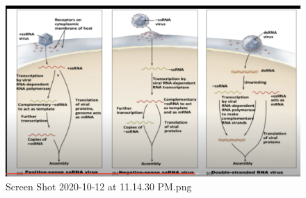 \documentclass[letterpaper]{article}
\begin{document}
\begin{figure}[htbp]
\centering
\includegraphics[width=.9\linewidth]{Screen Shot 2020-10-12 at 11.14.30 PM.png}
\caption{Screen Shot 2020-10-12 at 11.14.30 PM.png}
\end{figure}
\end{document}
